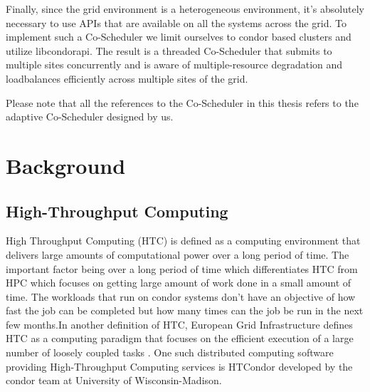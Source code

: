 \documentclass[ms,electronic,double]{nuthesis}
\begin{document}
Finally, since the grid environment is a heterogeneous environment, it's absolutely necessary
to use APIs that are available on all the systems across the grid. To implement such a Co-Scheduler
 we limit ourselves to condor based clusters and utilize libcondorapi. The result is a threaded Co-Scheduler 
that submits to multiple sites concurrently and is aware of multiple-resource degradation and
loadbalances efficiently across multiple sites of the grid. 

Please note that all the references to the Co-Scheduler in this thesis refers to the adaptive Co-Scheduler designed 
by us.  

\chapter{Background}

\section{High-Throughput Computing} High Throughput Computing (HTC) is defined as 
a computing environment that delivers large amounts of computational
power over a long period of time.  The important factor being over a long period of time which 
differentiates HTC from HPC which focuses on getting large amount of work done in a small amount of time.
The workloads that run on condor systems don't have an objective of  how fast the job can be completed 
but how many times can the job be run in the next few months.In another definition of HTC, European Grid  
Infrastructure defines HTC as a computing paradigm that focuses on the efficient 
execution of a large number of loosely coupled tasks \cite{manual56}. One such 
distributed computing software providing High-Throughput Computing services is 
HTCondor developed by the condor team at University of Wisconsin-Madison.
\end{document}
